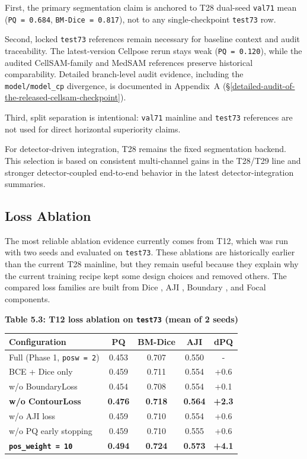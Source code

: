 First, the primary segmentation claim is anchored to T28 dual-seed \texttt{val71} mean (\texttt{PQ\ =\ 0.684}, \texttt{BM-Dice\ =\ 0.817}), not to any single-checkpoint \texttt{test73} row.

Second, locked \texttt{test73} references remain necessary for baseline context and audit traceability. The latest-version Cellpose rerun stays weak (\texttt{PQ\ =\ 0.120}), while the audited CellSAM-family and MedSAM references preserve historical comparability. Detailed branch-level audit evidence, including the \texttt{model/model\_cp} divergence, is documented in Appendix~A (\S\ref{detailed-audit-of-the-released-cellsam-checkpoint}).

Third, split separation is intentional: \texttt{val71} mainline and \texttt{test73} references are not used for direct horizontal superiority claims.

For detector-driven integration, T28 remains the fixed segmentation backend. This selection is based on consistent multi-channel gains in the T28/T29 line and stronger detector-coupled end-to-end behavior in the latest detector-integration summaries.

\subsection{Loss Ablation}\label{loss-ablation}

The most reliable ablation evidence currently comes from T12, which was run with two seeds and evaluated on \texttt{test73}. These ablations are historically earlier than the current T28 mainline, but they remain useful because they explain why the current training recipe kept some design choices and removed others. The compared loss families are built from Dice \cite{milletari2016vnet}, AJI \cite{kumar2017aji}, Boundary \cite{kervadec2019boundary}, and Focal \cite{lin2017focal} components.

\textbf{Table 5.3: T12 loss ablation on \texttt{test73} (mean of 2 seeds)}

{%
\begin{longtable}[]{@{}lcccc@{}}
\toprule\noalign{}
Configuration & PQ & BM-Dice & AJI & dPQ \\
\midrule\noalign{}
\endhead
\bottomrule\noalign{}
\endlastfoot
Full (Phase 1, \texttt{posw\ =\ 2}) & 0.453 & 0.707 & 0.550 & - \\
BCE + Dice only & 0.459 & 0.711 & 0.554 & +0.6 \\
w/o BoundaryLoss & 0.454 & 0.708 & 0.554 & +0.1 \\
\textbf{w/o ContourLoss} & \textbf{0.476} & \textbf{0.718} & \textbf{0.564} & \textbf{+2.3} \\
w/o AJI loss & 0.459 & 0.710 & 0.554 & +0.6 \\
w/o PQ early stopping & 0.459 & 0.710 & 0.555 & +0.6 \\
\textbf{\texttt{pos\_weight\ =\ 10}} & \textbf{0.494} & \textbf{0.724} & \textbf{0.573} & \textbf{+4.1} \\
\end{longtable}
}

